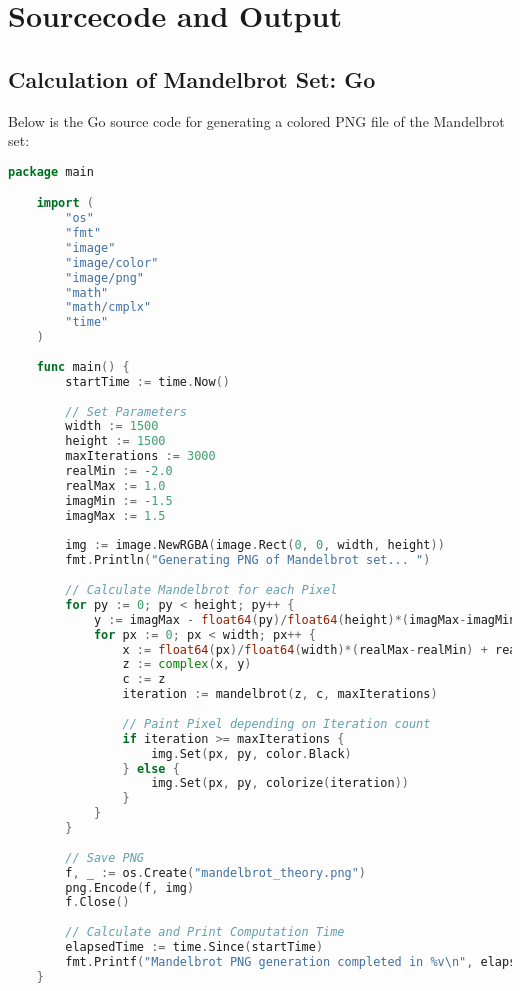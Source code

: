 \section{Sourcecode and Output}

\subsection{Calculation of Mandelbrot Set: Go}
\label{app:code:mandelbrot1}
Below is the Go source code for generating a colored PNG file of the Mandelbrot set:

\begin{lstlisting}[language=go, frame=tb, caption={Mandelbrot Set Calculation: Go}]
    package main

    import (
        "os"
        "fmt"
        "image"
        "image/color"
        "image/png"
        "math"
        "math/cmplx"
        "time"
    )
    
    func main() {
        startTime := time.Now()
    
        // Set Parameters
        width := 1500
        height := 1500
        maxIterations := 3000
        realMin := -2.0
        realMax := 1.0
        imagMin := -1.5
        imagMax := 1.5
    
        img := image.NewRGBA(image.Rect(0, 0, width, height))
        fmt.Println("Generating PNG of Mandelbrot set... ")
    
        // Calculate Mandelbrot for each Pixel
        for py := 0; py < height; py++ {
            y := imagMax - float64(py)/float64(height)*(imagMax-imagMin)
            for px := 0; px < width; px++ {
                x := float64(px)/float64(width)*(realMax-realMin) + realMin
                z := complex(x, y)
                c := z
                iteration := mandelbrot(z, c, maxIterations)
    
                // Paint Pixel depending on Iteration count
                if iteration >= maxIterations {
                    img.Set(px, py, color.Black)
                } else {
                    img.Set(px, py, colorize(iteration))
                }
            }
        }
    
        // Save PNG
        f, _ := os.Create("mandelbrot_theory.png")
        png.Encode(f, img)
        f.Close()
    
        // Calculate and Print Computation Time
        elapsedTime := time.Since(startTime)
        fmt.Printf("Mandelbrot PNG generation completed in %v\n", elapsedTime)
    }
    

\end{lstlisting}
